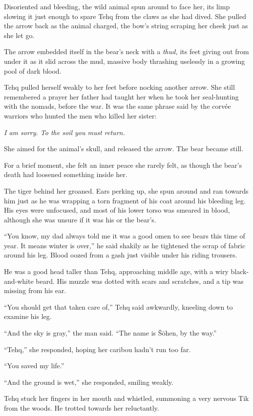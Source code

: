 Disoriented and bleeding, the wild animal spun around to face her, its limp slowing it just enough to spare Tehq from the claws as she had dived. She pulled the arrow back as the animal charged, the bow's string scraping her cheek just as she let go.

The arrow embedded itself in the bear's neck with a \emph{thud,} its feet giving out from under it as it slid across the mud, massive body thrashing uselessly in a growing pool of dark blood.

Tehq pulled herself weakly to her feet before nocking another arrow. She still remembered a prayer her father had taught her when he took her seal-hunting with the nomads, before the war. It was the same phrase said by the corvée warriors who hunted the men who killed her sister:

\emph{I am sorry. To the soil you must return.}

She aimed for the animal's skull, and released the arrow. The bear became still.

For a brief moment, she felt an inner peace she rarely felt, as though the bear's death had loosened something inside her.

The tiger behind her groaned. Ears perking up, she spun around and ran towards him just as he was wrapping a torn fragment of his coat around his bleeding leg. His eyes were unfocused, and most of his lower torso was smeared in blood, although she was unsure if it was his or the bear's.

``You know, my dad always told me it was a good omen to see bears this time of year. It means winter is over,'' he said shakily as he tightened the scrap of fabric around his leg. Blood oozed from a gash just visible under his riding trousers.

He was a good head taller than Tehq, approaching middle age, with a wiry black-and-white beard. His muzzle was dotted with scars and scratches, and a tip was missing from his ear.

``You should get that taken care of,'' Tehq said awkwardly, kneeling down to examine his leg.

``And the sky is gray,'' the man said. ``The name is Šōhen, by the way.''

``Tehq,'' she responded, hoping her caribou hadn't run too far.

``You saved my life.''

``And the ground is wet,'' she responded, smiling weakly.

Tehq stuck her fingers in her mouth and whistled, summoning a very nervous Tik from the woods. He trotted towards her reluctantly.

